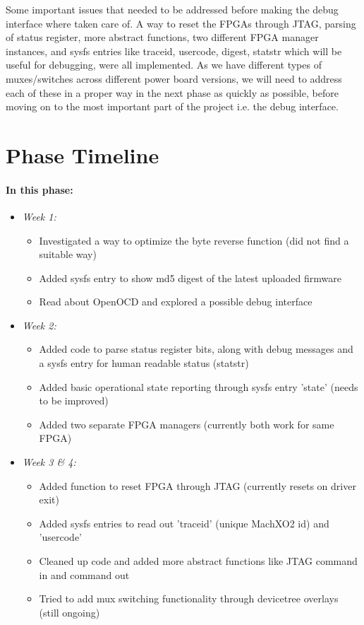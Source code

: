 \documentclass{article}
\begin{document}
Some important issues that needed to be addressed before making the debug
interface where taken care of. A way to reset the FPGAs through JTAG,
parsing of status register, more abstract functions, two different FPGA manager
instances, and sysfs entries like traceid, usercode, digest, statstr which will
be useful for debugging, were all implemented. As we have different types of muxes/switches
across different power board versions, we will need to address each of these
in a proper way in the next phase as quickly as possible, before moving on to
the most important part of the project i.e. the debug interface.


\section{Phase Timeline}

\paragraph{In this phase:}
\begin{itemize}
\item \emph{Week 1:} 
	\begin{itemize}
	\item Investigated a way to optimize the byte reverse function (did not find a suitable way) 
	\item Added sysfs entry to show md5 digest of the latest uploaded firmware 
	\item Read about OpenOCD and explored a possible debug interface
	\end{itemize}
\item \emph{Week 2:} 
	\begin{itemize}
	\item Added code to parse status register bits, along with debug messages
		and a sysfs entry for human readable status (statstr)
	\item Added basic operational state reporting through sysfs entry 'state'
		(needs to be improved)
	\item Added two separate FPGA managers (currently both work for same FPGA) 
	\end{itemize}
\newpage
\item \emph{Week 3 \& 4:} 
	\begin{itemize}
	\item Added function to reset FPGA through JTAG (currently resets on driver exit)
	\item Added sysfs entries to read out 'traceid' (unique MachXO2 id) and 'usercode'
	\item Cleaned up code and added more abstract functions like JTAG command in and command out
	\item Tried to add mux switching functionality through devicetree overlays (still ongoing)
	\end{itemize}
\end{itemize}
\end{document}

